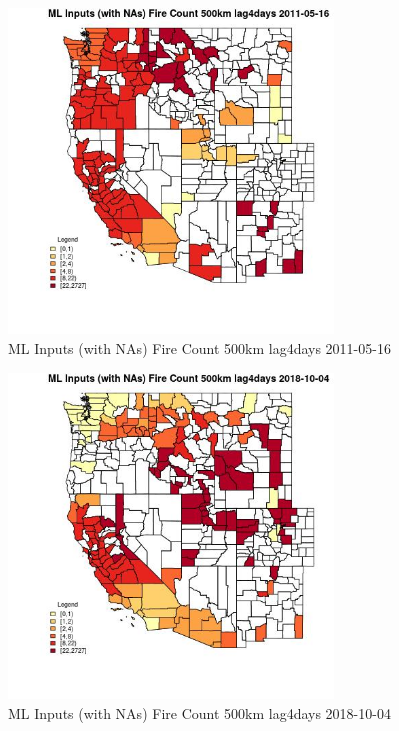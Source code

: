 \begin{figure} 
\centering  
\includegraphics[width=0.77\textwidth]{Code_Outputs/Report_ML_input_PM25_Step4_part_f_de_duplicated_aves_prioritize_24hr_obswNAs_CountyFire_Count_500km_lag4daysMean2011-05-16.jpg} 
\caption{\label{fig:Report_ML_input_PM25_Step4_part_f_de_duplicated_aves_prioritize_24hr_obswNAsCountyFire_Count_500km_lag4daysMean2011-05-16}ML Inputs (with NAs) Fire Count 500km lag4days 2011-05-16} 
\end{figure} 
 

\begin{figure} 
\centering  
\includegraphics[width=0.77\textwidth]{Code_Outputs/Report_ML_input_PM25_Step4_part_f_de_duplicated_aves_prioritize_24hr_obswNAs_CountyFire_Count_500km_lag4daysMean2018-10-04.jpg} 
\caption{\label{fig:Report_ML_input_PM25_Step4_part_f_de_duplicated_aves_prioritize_24hr_obswNAsCountyFire_Count_500km_lag4daysMean2018-10-04}ML Inputs (with NAs) Fire Count 500km lag4days 2018-10-04} 
\end{figure} 
 

